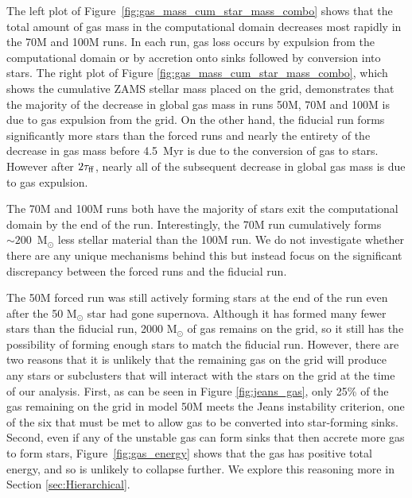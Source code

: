 \documentclass[twoside]{drexel-thesis}
\begin{document}
\begin{thesis}
The left plot of Figure~\ref{fig:gas_mass_cum_star_mass_combo} shows that the total amount of gas mass in the computational domain decreases most rapidly in the 70M and 100M runs. In each run, gas loss occurs by expulsion from the computational domain or by accretion onto sinks followed by conversion into stars. The right plot of Figure \ref{fig:gas_mass_cum_star_mass_combo}, which shows the cumulative ZAMS stellar mass placed on the grid, demonstrates that the  majority of the decrease in global gas mass in runs 50M, 70M and 100M is due to gas expulsion from the grid. On the other hand, the fiducial run forms significantly more stars than the forced runs and nearly the entirety of the decrease in gas mass before 4.5~Myr is due to the conversion of gas to stars. However after $2\tau_{\rm ff}$, nearly all of the subsequent decrease in global gas mass is due to gas expulsion. 

The 70M and 100M runs both have the majority of stars exit the computational domain by the end of the run. Interestingly, the 70M run cumulatively forms $\sim200$~M$_\odot$ less stellar material than the 100M run. We do not investigate whether there are any unique mechanisms behind this but instead focus on the significant discrepancy between the forced runs and the fiducial run.

The 50M forced run was still actively forming stars at the end of the run even after the 50 M$_{\odot}$ star had gone supernova. Although it has formed many fewer stars than  the fiducial run, 2000 M$_{\odot}$ of gas remains on the grid, so it still has the possibility of forming enough stars to match the fiducial run. However, there are two reasons that it is unlikely that the remaining gas on the grid will produce any stars or subclusters that will interact with the stars on the grid at the time of our analysis. First, as can be seen in Figure \ref{fig:jeans_gas}, only 25\% of the gas remaining on the grid in model 50M meets the Jeans instability criterion, one of the six that must be met to allow gas to be converted into star-forming sinks. 
Second, even if any of the unstable gas can form sinks that then accrete more gas to form stars, Figure~\ref{fig:gas_energy} shows that the gas has positive total energy, and so is unlikely to collapse further. We explore this reasoning more in Section \ref{sec:Hierarchical}.  


\end{thesis}
\end{document}
